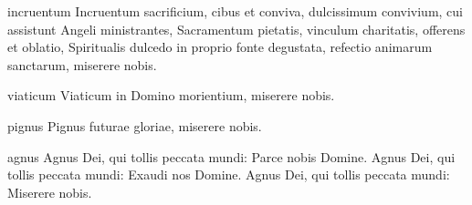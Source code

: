 \documentclass[tocstyle=ref]{ees}
\begin{document}
{\begin{movement}{incruentum}
  Incruentum sacrificium,
  cibus et conviva,
  dulcissimum convivium,
  cui assistunt Angeli ministrantes,
  Sacramentum pietatis,
  vinculum charitatis,
  offerens et oblatio,
  Spiritualis dulcedo in proprio fonte degustata,
  refectio animarum sanctarum,
  miserere nobis.
\end{movement}

\begin{movement}{viaticum}
  Viaticum in Domino morientium,
  miserere nobis.
\end{movement}

\begin{movement}{pignus}
  Pignus futurae gloriae,
  miserere nobis.
\end{movement}

\begin{movement}{agnus}
  Agnus Dei, qui tollis peccata mundi: Parce nobis Domine.
  Agnus Dei, qui tollis peccata mundi: Exaudi nos Domine.
  Agnus Dei, qui tollis peccata mundi: Miserere nobis.
\end{movement}
}

\eesScore
\end{document}
